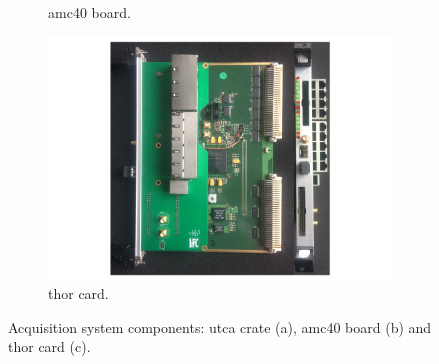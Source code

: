 \begin{figure}
\begin{subfigure}[htbp]{.41\textwidth}
\caption{\gls{amc}40 board.}
\label{chap3::fig::AMC40}
\end{subfigure}
\newline
\begin{subfigure}[b]{\textwidth}
\centering
\includegraphics[width=0.8\linewidth]{03_GraphicFiles/chapter3_CLaRySproto/Electronics_Acquisition/THOR.pdf}
\caption{\gls{thor} card.}
\label{chap3::fig::THOR}
\end{subfigure}
\caption{Acquisition system components: \gls{utca} crate (a), \gls{amc}40 board (b) and \gls{thor} card (c).}
\label{chap3::fig::AcquisitionSystem}
\end{figure}


